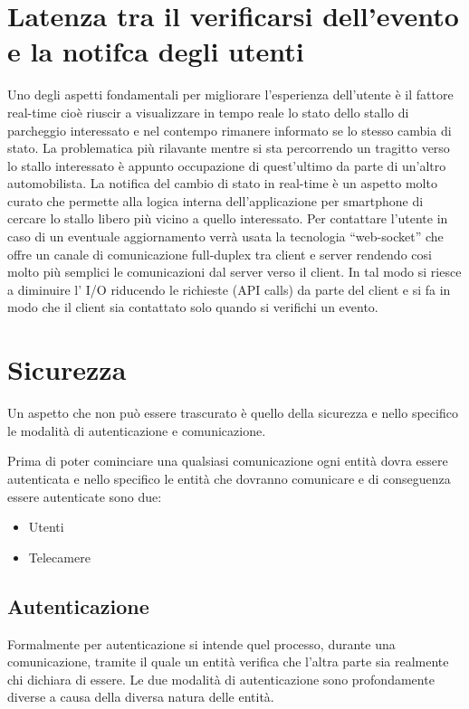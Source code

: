 \section*{Latenza tra il verificarsi dell'evento e la notifca degli utenti}
Uno degli aspetti fondamentali per migliorare l'esperienza dell'utente è il fattore real-time cioè riuscir a visualizzare in tempo reale lo stato dello stallo di parcheggio interessato e nel contempo rimanere informato se lo stesso cambia di stato. La problematica più rilavante mentre si sta percorrendo un tragitto verso lo stallo interessato è appunto occupazione di quest'ultimo da parte di un'altro automobilista. La notifica del cambio di stato in real-time è un aspetto molto curato che permette alla logica interna dell'applicazione per smartphone di cercare lo stallo libero più vicino a quello interessato. Per contattare l'utente  in caso di un eventuale aggiornamento verrà usata la tecnologia ``web-socket'' che offre un canale di comunicazione full-duplex tra client e server rendendo cosi molto più semplici le comunicazioni dal server verso il client. 
In tal modo si riesce a diminuire l' I/O riducendo le richieste (API calls) da parte del client e si fa in modo che il client sia contattato solo quando si verifichi un evento. 

\section*{Sicurezza}
Un aspetto che non può essere trascurato è quello della sicurezza e nello specifico le modalità di autenticazione e comunicazione.


Prima di poter cominciare una qualsiasi comunicazione ogni entità dovra essere autenticata e nello specifico le entità che dovranno comunicare e di conseguenza essere autenticate sono due:

\begin{itemize}
	\item Utenti
	\item Telecamere
\end{itemize}

\subsection*{Autenticazione} 
Formalmente per autenticazione si intende quel processo, durante una comunicazione, tramite il quale un entità verifica che l'altra parte sia realmente chi dichiara di essere.
Le due modalità di autenticazione sono profondamente diverse a causa della diversa natura delle entità. 

